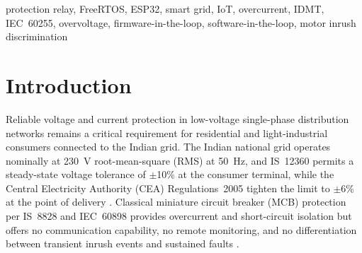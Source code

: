 \documentclass[conference]{IEEEtran}
\begin{document}
\begin{abstract}
This paper presents the Smart Grid Sentinel (SGS), a real-time
single-phase protection relay and grid-monitoring system for the Indian
residential supply at \SI{230}{\volt}, \SI{50}{\hertz}.  Running on an
ESP32 dual-core microcontroller under FreeRTOS, the SGS implements a
six-stage fault-detection pipeline---overvoltage, undervoltage, IDMT
overcurrent, short-circuit, thermal overload, and sensor
failure---aligned with IS~12360, CEA~2005, and IEC~60255
\cite{iec60255}--\cite{is8828}.  Two contributions are quantified:
(i)~a discrete IDMT accumulator whose trip-time error relative to the
IEC~60255 Standard Inverse formula remains within $0.42\%$ across eleven
test currents; and (ii)~a slope-gated short-circuit discriminator that
suppresses motor inrush false trips while preserving fault sensitivity.
Validation employs a co-located Software-in-the-Loop digital twin
exercised via Firmware-in-the-Loop methodology on physical ESP32
silicon; scope and limitations are discussed.  The system provides
MQTT telemetry over TLS, an HTTP REST API, WebSocket push, and a
local HMI.
\end{abstract}

\begin{IEEEkeywords}
protection relay, FreeRTOS, ESP32, smart grid, IoT, overcurrent,
IDMT, IEC~60255, overvoltage, firmware-in-the-loop,
software-in-the-loop, motor inrush discrimination
\end{IEEEkeywords}



\section{Introduction}

Reliable voltage and current protection in low-voltage single-phase
distribution networks remains a critical requirement for residential and
light-industrial consumers connected to the Indian grid.  The Indian
national grid operates nominally at \SI{230}{\volt} root-mean-square
(RMS) at \SI{50}{\hertz}, and IS~12360 permits a steady-state voltage
tolerance of $\pm$10\% at the consumer terminal, while the Central
Electricity Authority (CEA) Regulations~2005 tighten the limit to
$\pm$6\% at the point of delivery \cite{is12360,cea2005}.
Classical miniature circuit breaker (MCB) protection per IS~8828 and
IEC~60898 provides overcurrent and short-circuit isolation but offers
no communication capability, no remote monitoring, and no
differentiation between transient inrush events and sustained faults
\cite{is8828,iec60898}.
\end{document}
